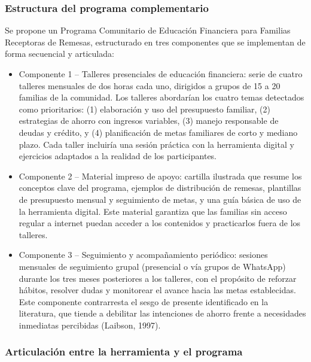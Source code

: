 \documentclass[12pt,letterpaper]{article}
\providecommand{\tightlist}{\setlength{\itemsep}{0pt}\setlength{\parskip}{0pt}}
\begin{document}
\subsubsection{\texorpdfstring{\textbf{Estructura del programa complementario}}{Estructura del programa complementario}}\label{estructura-del-programa-complementario}

Se propone un Programa Comunitario de Educación Financiera para Familias Receptoras de Remesas, estructurado en tres componentes que se implementan de forma secuencial y articulada:

\begin{itemize}
\tightlist
\item
  Componente 1 -- Talleres presenciales de educación financiera: serie de cuatro talleres mensuales de dos horas cada uno, dirigidos a grupos de 15 a 20 familias de la comunidad. Los talleres abordarían los cuatro temas detectados como prioritarios: (1) elaboración y uso del presupuesto familiar, (2) estrategias de ahorro con ingresos variables, (3) manejo responsable de deudas y crédito, y (4) planificación de metas familiares de corto y mediano plazo. Cada taller incluiría una sesión práctica con la herramienta digital y ejercicios adaptados a la realidad de los participantes.
\item
  Componente 2 -- Material impreso de apoyo: cartilla ilustrada que resume los conceptos clave del programa, ejemplos de distribución de remesas, plantillas de presupuesto mensual y seguimiento de metas, y una guía básica de uso de la herramienta digital. Este material garantiza que las familias sin acceso regular a internet puedan acceder a los contenidos y practicarlos fuera de los talleres.
\item
  Componente 3 -- Seguimiento y acompañamiento periódico: sesiones mensuales de seguimiento grupal (presencial o vía grupos de WhatsApp) durante los tres meses posteriores a los talleres, con el propósito de reforzar hábitos, resolver dudas y monitorear el avance hacia las metas establecidas. Este componente contrarresta el sesgo de presente identificado en la literatura, que tiende a debilitar las intenciones de ahorro frente a necesidades inmediatas percibidas (Laibson, 1997).
\end{itemize}

\subsubsection{\texorpdfstring{\textbf{Articulación entre la herramienta y el programa}}{Articulación entre la herramienta y el programa}}\label{articulaciuxf3n-entre-la-herramienta-y-el-programa}
\end{document}
